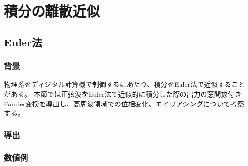 \chapter{積分の離散近似}
    \section{Euler法}
        \subsection{背景}
            物理系をディジタル計算機で制御するにあたり、積分をEuler法で近似することがある。
            本節では正弦波をEuler法で近似的に積分した際の出力の窓関数付きFourier変換を導出し、高周波領域での位相変化、エイリアシングについて考察する。
        \subsection{導出}
        \subsection{数値例}
